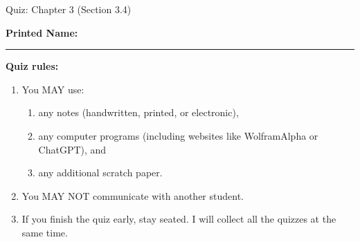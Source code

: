 \documentclass[10pt]{exam}
\theoremstyle{definition}
\begin{document}
\begin{center}
    {
\Large
    Quiz: Chapter 3 (Section 3.4)

    \vspace{0.1in}
}
\end{center}


\vspace{0.2in}
\noindent
\textbf{Printed Name:}

\noindent
\rule{\textwidth}{0.1pt}
\vspace{0.15in}

\noindent
\textbf{Quiz rules:}
\begin{enumerate}
    \item You MAY use:
        \begin{enumerate}
            \item any notes (handwritten, printed, or electronic),
            \item any computer programs (including websites like WolframAlpha or ChatGPT), and
            \item any additional scratch paper.
        \end{enumerate}
    \item You MAY NOT communicate with another student.
    \item If you finish the quiz early, stay seated.
        I will collect all the quizzes at the same time.
\end{enumerate}
\end{document}
